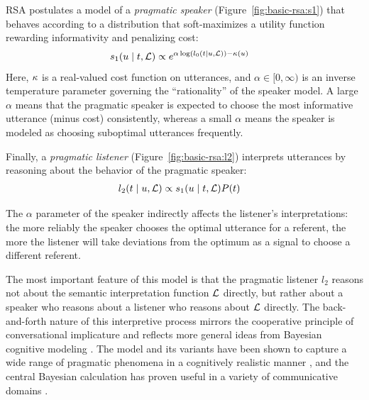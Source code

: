 \documentclass[11pt,letterpaper]{article}
\newcommand{\term}{\textit}
\newcommand{\utt}{u}
\newcommand{\target}{t}
\renewcommand{\|}{\mid}
\newcommand{\figref}[1]{Figure~\ref{#1}}
\begin{document}
RSA postulates a model of a \term{pragmatic speaker} (\figref{fig:basic-rsa:s1}) that
behaves according to a distribution that soft-maximizes
a utility function rewarding informativity and penalizing cost:
\begin{align}
  s_{1}(\utt \| \target, \Lex)
  &\propto
  e^{\alpha\log(l_{0}(\target \| \utt, \Lex)) - \Costs(\utt)}
  \label{eq:rsa-s1}
\end{align}
Here, $\kappa$ is a real-valued cost function on utterances, and
$\alpha \in [0,\infty)$ is an inverse temperature parameter governing
the ``rationality'' of the speaker model.
A large $\alpha$ means that the pragmatic speaker is expected to choose
the most informative utterance (minus cost)
consistently, whereas a small $\alpha$ means the
speaker is modeled as choosing suboptimal utterances frequently.

Finally, a \term{pragmatic listener} (\figref{fig:basic-rsa:l2})
interprets utterances by reasoning about the behavior of the pragmatic speaker:
\begin{align}
  l_{2}(\target \| \utt, \Lex)
  &\propto
  s_{1}(\utt \| \target, \Lex) \targetPrior(\target)
  \label{eq:rsa-l2}
\end{align}

The $\alpha$ parameter of the speaker indirectly affects the
listener's interpretations: the more reliably the speaker
chooses the optimal utterance for a referent, the more the listener
will take deviations from the optimum as a signal to choose a
different referent.

The most important feature of this model is that the pragmatic
listener $l_{2}$ reasons not about the semantic interpretation
function $\mathcal{L}$ directly, but rather about a speaker who reasons about
a listener who reasons about $\mathcal{L}$ directly. The back-and-forth
nature of this interpretive process mirrors the
cooperative principle of conversational implicature \cite{Grice75} and
reflects more general ideas from Bayesian cognitive modeling
\cite{Tenenbaum-etal:2011}. The model and its variants have been shown
to capture a wide range of pragmatic phenomena in a cognitively
realistic manner
\cite{Goodman2013,Smith:Goodman:Frank:2013,Kao-etal:2014,Bergen:Levy:Goodman:2014},
and the central Bayesian calculation has proven useful in a variety of
communicative domains
\cite{Tellex2014a,Vogel:Potts:Jurafsky:2013}.
\end{document}
